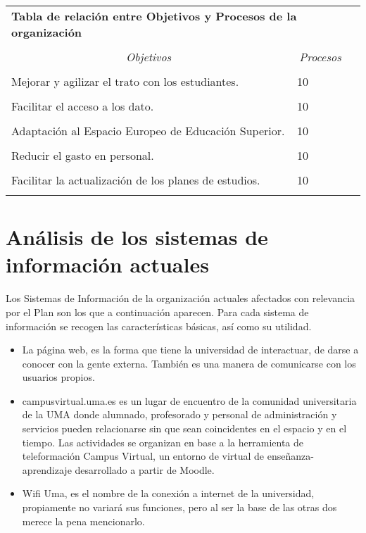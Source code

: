 \documentclass[11pt,a4paper,spanish,twoside]{book}
\begin{document}
\begin{table}[!ht]
  \centering
  \begin{tabular}{lp{5cm}c}
    \multicolumn{2}{l}{\Large \textbf{Tabla de relación entre Objetivos y Procesos de la organización} } \\ \\
    \multicolumn{1}{c}{\emph{Objetivos}} & 
    \multicolumn{1}{c}{\emph{Procesos}} \\
    \hline \\
    Mejorar y agilizar el trato con los estudiantes.         & 10 \\ \\
    Facilitar el acceso a los dato.         & 10 \\ \\
    Adaptación al Espacio Europeo de Educación Superior.         & 10 \\ \\
    Reducir el gasto en personal.         & 10 \\ \\
    Facilitar la actualización de los planes de estudios.         & 10 \\ \\
    \hline
  \end{tabular}
\end{table}
\section{Análisis de los sistemas de información actuales}
Los Sistemas de Información de la organización actuales afectados con 
relevancia por el Plan son los que a continuación aparecen. Para cada sistema 
de información se recogen las características básicas, así como su utilidad.
\begin{itemize}
  \item La página web, es la forma que tiene la universidad de interactuar, de 
darse a conocer con la gente externa. También es una manera de comunicarse con
los usuarios propios.
  \item campusvirtual.uma.es es un lugar de encuentro de la comunidad 
universitaria de la UMA donde alumnado, profesorado y personal de 
administración y servicios pueden relacionarse sin que sean coincidentes en el 
espacio y en el tiempo. Las actividades se organizan en base a la herramienta 
de teleformación Campus Virtual, un entorno de virtual de enseñanza-aprendizaje 
desarrollado a partir de Moodle.
  \item Wifi Uma, es el nombre de la conexión a internet de la universidad, 
propiamente no variará sus funciones, pero al ser la base de las otras dos 
merece la pena mencionarlo. 

\end{itemize}
\end{document}
